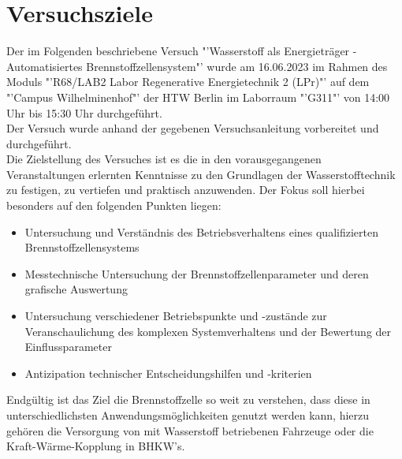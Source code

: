 \section{Versuchsziele}
\label{sec:Versuchsziele}
Der im Folgenden beschriebene Versuch "'Wasserstoff als Energieträger -
Automatisiertes Brennstoffzellensystem"' wurde am 16.06.2023 im Rahmen des Moduls
"'R68/LAB2 Labor Regenerative Energietechnik 2 (LPr)"'
auf dem "'Campus Wilhelminenhof"' der HTW Berlin
im Laborraum "'G311"' von 14:00 Uhr bis 15:30 Uhr durchgeführt.\\
Der Versuch wurde anhand der gegebenen Versuchsanleitung \cite{Anleitung}
vorbereitet und durchgeführt.\\
Die Zielstellung des Versuches ist es die in den vorausgegangenen Veranstaltungen
erlernten Kenntnisse zu den Grundlagen der Wasserstofftechnik zu festigen,
zu vertiefen und praktisch anzuwenden. Der Fokus soll hierbei besonders auf den
folgenden Punkten liegen:
\begin{itemize}
    \item Untersuchung und Verständnis des Betriebsverhaltens eines qualifizierten Brennstoffzellensystems
    \item Messtechnische Untersuchung der Brennstoffzellenparameter und deren grafische Auswertung
    \item Untersuchung verschiedener Betriebspunkte und -zustände zur Veranschaulichung des komplexen Systemverhaltens und der Bewertung der Einflussparameter
    \item Antizipation technischer Entscheidungshilfen und -kriterien
\end{itemize}
\vspace{\baselineskip}
Endgültig ist das Ziel die Brennstoffzelle so weit zu verstehen, dass diese
in unterschiedlichsten Anwendungsmöglichkeiten genutzt werden kann, hierzu
gehören die Versorgung von mit Wasserstoff betriebenen Fahrzeuge oder die
Kraft-Wärme-Kopplung in BHKW's.
